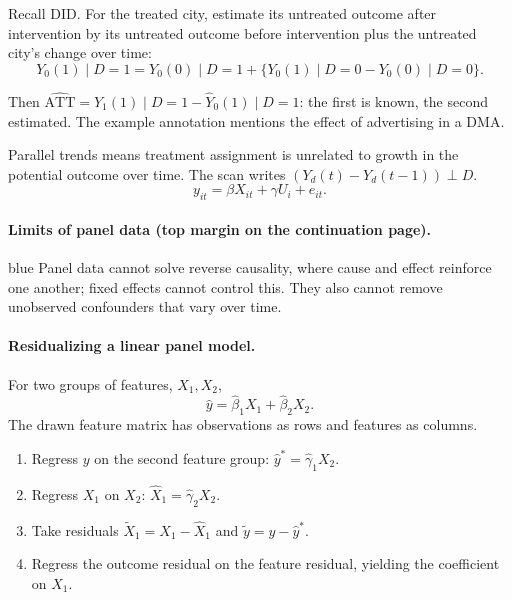 {Recall DID. For the treated city, estimate its untreated outcome after intervention by its untreated outcome before intervention plus the untreated city's change over time:
\[Y_0(1)\mid D=1
=Y_0(0)\mid D=1+\{Y_0(1)\mid D=0-Y_0(0)\mid D=0\}.
\]

Then $\widehat{\mathrm{ATT}}=Y_1(1)\mid D=1-\widehat Y_0(1)\mid D=1$: the first is known, the second estimated. The example annotation mentions the effect of advertising in a DMA.

Parallel trends means treatment assignment is unrelated to growth in the potential outcome over time. The scan writes $(Y_d(t)-Y_d(t-1))\perp D$.
\[y_{it}=\beta X_{it}+\gamma U_i+e_{it}.\]

\paragraph{Limits of panel data (top margin on the continuation page).}
\begin{inkblock}{blue}
Panel data cannot solve reverse causality, where cause and effect reinforce one another; fixed effects cannot control this. They also cannot remove unobserved confounders that vary over time.
\end{inkblock}

\paragraph{Residualizing a linear panel model.}
For two groups of features, $X_1,X_2$,
\[\hat y=\hat\beta_1X_1+\hat\beta_2X_2.\]
The drawn feature matrix has observations as rows and features as columns.
\begin{enumerate}
\item Regress $y$ on the second feature group: $\hat y^*=\hat\gamma_1X_2$.
\item Regress $X_1$ on $X_2$: $\hat X_1=\hat\gamma_2X_2$.
\item Take residuals $\widetilde X_1=X_1-\hat X_1$ and $\widetilde y=y-\hat y^*$.
\item Regress the outcome residual on the feature residual, yielding the coefficient on $X_1$.
\end{enumerate}

}
